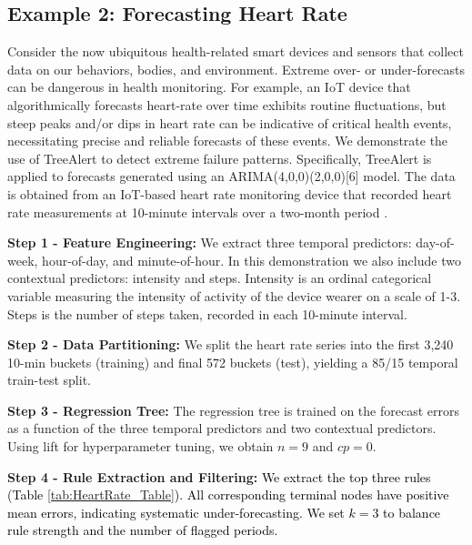 \documentclass[]{interact}
\newcommand{\matt}[1]{\textcolor{black}{#1}}
\theoremstyle{plain}
\theoremstyle{definition}
\theoremstyle{remark}
\begin{document}
\FloatBarrier
\subsection{Example 2: Forecasting Heart Rate}
\label{subsec:heartrate}

Consider the now ubiquitous health-related smart devices and sensors that collect data on our behaviors, bodies, and environment. Extreme over- or under-forecasts can be dangerous in health monitoring. For example, an IoT device that algorithmically forecasts heart-rate over time exhibits routine fluctuations, but steep peaks and/or dips in heart rate can be indicative of critical health events, necessitating precise and reliable forecasts of these events. We demonstrate the use of TreeAlert to detect extreme failure patterns. Specifically, TreeAlert is applied to forecasts  generated using an ARIMA(4,0,0)(2,0,0)[6] model.  The data is obtained from an IoT-based heart rate monitoring device that recorded heart rate measurements at 10-minute intervals over a two-month period \citep{furberg2016}.
\newline

\noindent\textbf{Step 1 - Feature Engineering:}
We extract three temporal predictors: day-of-week, hour-of-day, and minute-of-hour. In this demonstration we also include two contextual predictors: intensity and steps. Intensity is an ordinal categorical variable measuring the intensity of activity of the device wearer on a scale of 1-3. Steps is the number of steps taken, recorded in each 10-minute interval.
\newline

\noindent\textbf{Step 2 - Data Partitioning:}
We split the heart rate series into the first 3,240 10-min buckets (training) and final 572 buckets (test), yielding a 85/15 temporal train-test split.
\newline

\noindent\textbf{Step 3 - Regression Tree:}
The regression tree is trained on the forecast errors as a function of the three temporal predictors and two contextual predictors. Using lift for hyperparameter tuning, we obtain  $n = 9$ and $cp = 0$.
\newline

\noindent\textbf{Step 4 - Rule Extraction and Filtering:}
\matt{We extract the top three rules (Table \ref{tab:HeartRate_Table}). All corresponding terminal nodes have positive mean errors, indicating systematic under-forecasting. We set $k=3$ to balance rule strength and the number of flagged periods.}
\newline
\end{document}
